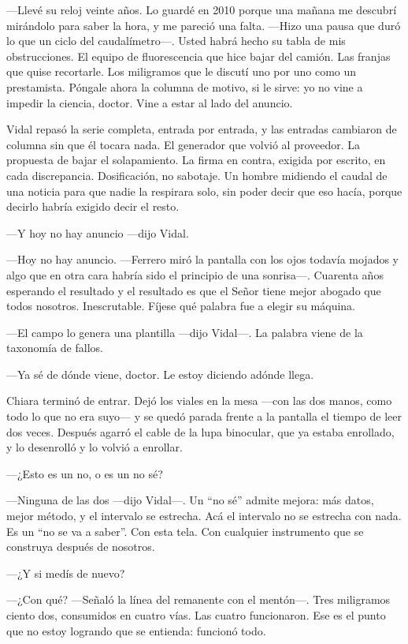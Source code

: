 ---Llevé su reloj veinte años. Lo guardé en 2010 porque una mañana me descubrí mirándolo para saber la hora, y me pareció una falta. ---Hizo una pausa que duró lo que un ciclo del caudalímetro---. Usted habrá hecho su tabla de mis obstrucciones. El equipo de fluorescencia que hice bajar del camión. Las franjas que quise recortarle. Los miligramos que le discutí uno por uno como un prestamista. Póngale ahora la columna de motivo, si le sirve: yo no vine a impedir la ciencia, doctor. Vine a estar al lado del anuncio.

Vidal repasó la serie completa, entrada por entrada, y las entradas cambiaron de columna sin que él tocara nada. El generador que volvió al proveedor. La propuesta de bajar el solapamiento. La firma en contra, exigida por escrito, en cada discrepancia. Dosificación, no sabotaje. Un hombre midiendo el caudal de una noticia para que nadie la respirara solo, sin poder decir que eso hacía, porque decirlo habría exigido decir el resto.

---Y hoy no hay anuncio ---dijo Vidal.

---Hoy no hay anuncio. ---Ferrero miró la pantalla con los ojos todavía mojados y algo que en otra cara habría sido el principio de una sonrisa---. Cuarenta años esperando el resultado y el resultado es que el Señor tiene mejor abogado que todos nosotros. Inescrutable. Fíjese qué palabra fue a elegir su máquina.

---El campo lo genera una plantilla ---dijo Vidal---. La palabra viene de la taxonomía de fallos.

---Ya sé de dónde viene, doctor. Le estoy diciendo adónde llega.

Chiara terminó de entrar. Dejó los viales en la mesa ---con las dos manos, como todo lo que no era suyo--- y se quedó parada frente a la pantalla el tiempo de leer dos veces. Después agarró el cable de la lupa binocular, que ya estaba enrollado, y lo desenrolló y lo volvió a enrollar.

---¿Esto es un no, o es un no sé?

---Ninguna de las dos ---dijo Vidal---. Un ``no sé'' admite mejora: más datos, mejor método, y el intervalo se estrecha. Acá el intervalo no se estrecha con nada. Es un ``no se va a saber''. Con esta tela. Con cualquier instrumento que se construya después de nosotros.

---¿Y si medís de nuevo?

---¿Con qué? ---Señaló la línea del remanente con el mentón---. Tres miligramos ciento dos, consumidos en cuatro vías. Las cuatro funcionaron. Ese es el punto que no estoy logrando que se entienda: funcionó todo.

